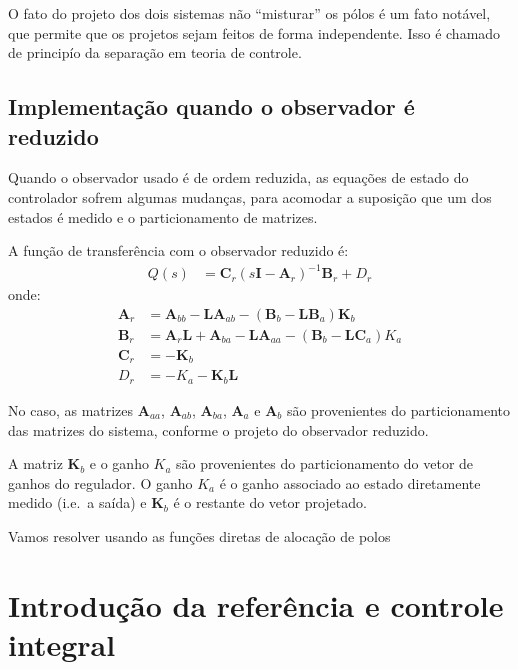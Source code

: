\documentclass[
]{book}
\begin{document}
O fato do projeto dos dois sistemas não ``misturar'' os pólos é um fato
notável, que permite que os projetos sejam feitos de forma independente.
Isso é chamado de principío da separação em teoria de controle.

\hypertarget{implementauxe7uxe3o-quando-o-observador-uxe9-reduzido}{%
\subsection{Implementação quando o observador é reduzido}\label{implementauxe7uxe3o-quando-o-observador-uxe9-reduzido}}

Quando o observador usado é de ordem reduzida, as equações de estado do
controlador sofrem algumas mudanças, para acomodar a suposição que um
dos estados é medido e o particionamento de matrizes.

A função de transferência com o observador reduzido é: \[
\begin{align*}
Q(s) &= \mathbf{C}_r(s\mathbf{I}-\mathbf{A}_r)^{-1}\mathbf{B}_r+D_r
\end{align*}
\] onde: \[
\begin{align*}
\mathbf{A}_r &= \mathbf{A}_{bb}-\mathbf{LA}_{ab}-(\mathbf{B}_{b}-\mathbf{LB}_{a})\mathbf{K}_b\\
\mathbf{B}_r &= \mathbf{A}_{r}\mathbf{L}+\mathbf{A}_{ba}-\mathbf{L}\mathbf{A}_{aa}-(\mathbf{B}_{b}-\mathbf{LC}_{a}){K}_a\\
\mathbf{C}_r &= -\mathbf{K}_b\\
D_r &= -K_a-\mathbf{K}_b\mathbf{L}
\end{align*}
\]

No caso, as matrizes \(\mathbf{A}_{aa}\), \(\mathbf{A}_{ab}\),
\(\mathbf{A}_{ba}\), \(\mathbf{A}_{a}\) e \(\mathbf{A}_{b}\) são provenientes
do particionamento das matrizes do sistema, conforme o projeto do
observador reduzido.

A matriz \(\mathbf{K}_{b}\) e o ganho \({K}_{a}\) são provenientes do
particionamento do vetor de ganhos do regulador. O ganho \(K_a\) é o ganho
associado ao estado diretamente medido (i.e.~a saída) e \(\mathbf{K}_{b}\)
é o restante do vetor projetado.



Vamos resolver usando as funções diretas de alocação de polos



\hypertarget{introduuxe7uxe3o-da-referuxeancia-e-controle-integral}{%
\section{Introdução da referência e controle integral}\label{introduuxe7uxe3o-da-referuxeancia-e-controle-integral}}
\end{document}
